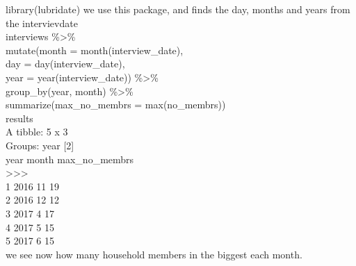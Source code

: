 \documentclass{article}
\begin{document}
library(lubridate)   we use this package, and finds the day, months and years from the intervievdate\\
interviews \%\textgreater\%\\
  mutate(month = month(interview\_date), \\
         day = day(interview\_date),\\
         year = year(interview\_date)) \%\textgreater\%\\
  group\_by(year, month) \%\textgreater\%\\
  summarize(max\_no\_membrs = max(no\_membrs))\\
  results \\
  A tibble: 5 x 3\\
  Groups:   year [2]\\
  year month max\_no\_membrs\\
 \textlessdbl\textgreater \textlessdbl\textgreater         \textlessdbl\textgreater\\
  1  2016    11            19\\
  2  2016    12            12\\
  3  2017     4            17\\
  4  2017     5            15\\
  5  2017     6            15\\
  we see now how many household members in the biggest each month. \\\\
\end{document}
